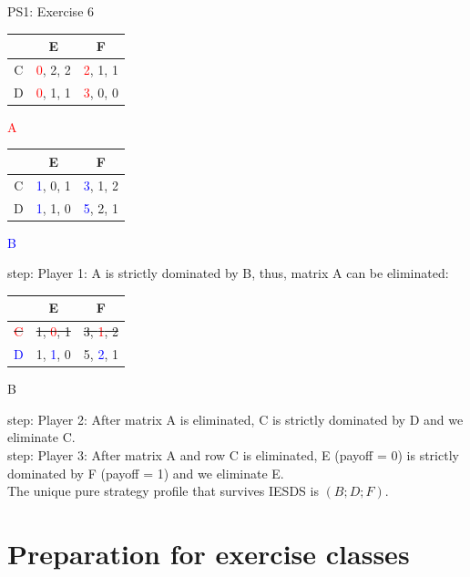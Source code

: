 \begin{frame}{PS1: Exercise 6}
\begin{multicols}{2}
\begin{table}
  \begin{tabular}{c|c|c}
      & E       & F       \\
    \midrule
    C & \textcolor{red}{0}, 2, 2 & \textcolor{red}{2}, 1, 1 \\
    \midrule
    D & \textcolor{red}{0}, 1, 1 & \textcolor{red}{3}, 0, 0
  \end{tabular}
  \center \textcolor{red}{A}
\end{table}
\columnbreak
\begin{table}
  \begin{tabular}{c|c|c}
      & E       & F       \\
    \midrule
    C & \textcolor{blue}{1}, 0, 1 & \textcolor{blue}{3}, 1, 2 \\
    \midrule
    D & \textcolor{blue}{1}, 1, 0 & \textcolor{blue}{5}, 2, 1
  \end{tabular}
  \center \textcolor{blue}{B}
\end{table}
\end{multicols}
 step: Player 1: A is strictly dominated by B, thus, matrix A can be eliminated:
\begin{multicols}{2}
\vfill\null
\columnbreak
\begin{table}
  \begin{tabular}{c|c|c}
      & E       & F       \\
    \midrule
    \sout{\textcolor{red}{C}} & \sout{1, \textcolor{red}{0}, 1} & \sout{3, \textcolor{red}{1}, 2} \\
    \midrule
    \textcolor{blue}{D} & 1, \textcolor{blue}{1}, 0 & 5, \textcolor{blue}{2}, 1
  \end{tabular}
  \center B
\end{table}
\end{multicols}
 step: Player 2: After matrix A is eliminated, C is strictly dominated by D and we eliminate C.
\\\medskip
{} step: Player 3: After matrix A and row C is eliminated, E (payoff = 0) is strictly dominated by F (payoff = 1) and we eliminate E.
\\\medskip
The unique pure strategy profile that survives IESDS is $(B;D;F)$.
\end{frame}


\section{Preparation for exercise classes}

